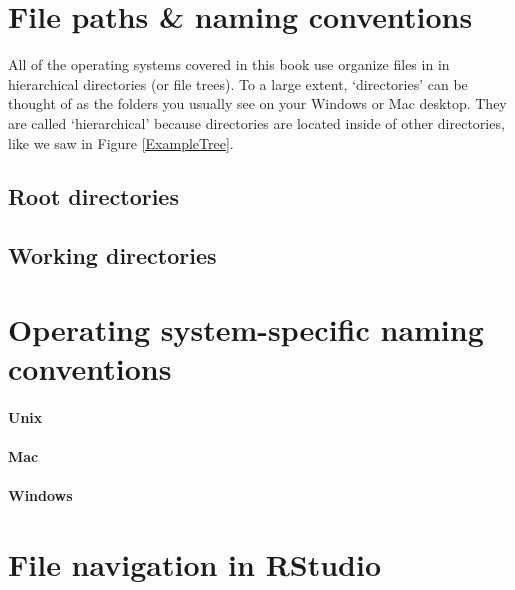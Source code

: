 \documentclass[ChapterTOCs,krantz1]{krantz}\usepackage{graphicx, color}
\begin{document}
{{\begin{landscape}
\begin{figure}[th!]
\begin{center}
    
    \end{center}
\end{figure}
\end{landscape}

\section{File paths \& naming conventions}

All of the operating systems covered in this book use organize files in in hierarchical directories (or file trees). To a large extent, `directories' can be thought of as the folders you usually see on your Windows or Mac desktop. They are called `hierarchical' because directories are located inside of other directories, like we saw in Figure \ref{ExampleTree}. 

\subsection{Root directories}

\subsection{Working directories}

\section{Operating system-specific naming conventions}

\paragraph{Unix}

\paragraph{Mac}

\paragraph{Windows}

\section{File navigation in RStudio}

}}
\end{document}
